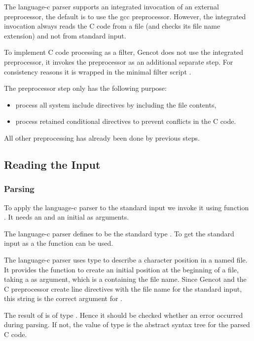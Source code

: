 The language-c parser supports an integrated invocation of an external preprocessor, the default is to use
the gcc preprocessor. However, the integrated invocation always reads the C code from a file (and checks
its file name extension) and not from standard input.

To implement C code processing as a filter, Gencot does not use the integrated preprocessor,
it invokes the preprocessor as an additional separate step. For consistency reasons it is wrapped in
the minimal filter script . 

The preprocessor step only has the following purpose:
\begin{itemize}
\item process all system include directives by including the file contents,
\item process retained conditional directives to prevent conflicts in the C code.
\end{itemize}
All other preprocessing has already been done by previous steps.

\subsection{Reading the Input}
\label{impl-ccode-read}

\subsubsection{Parsing}

To apply the language-c parser to the standard input we invoke it using function . It needs an 
and an initial  as arguments. 

The language-c parser defines  to be the standard type . To get the 
standard input as a  the function  can be used. 

The language-c parser uses type  to describe a character position in a named file. It provides
the function  to create an initial position at the beginning of a file, taking a 
as argument, which is a  containing the file name. Since Gencot and the C preprocessor create
line directives with the file name  for the standard input, this string is the correct argument
for . 

The result of  is of type . Hence it should be checked whether
an error occurred during parsing. If not, the value of type  is the abstract syntax tree for
the parsed C code.

